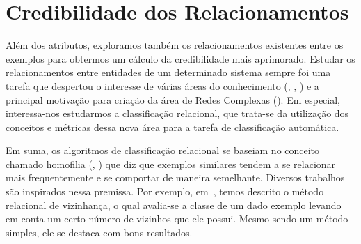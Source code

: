 

\section{Credibilidade dos Relacionamentos}
\label{sec::classificacaografos}

Além dos atributos, exploramos também os relacionamentos existentes entre os exemplos para obtermos um cálculo da credibilidade mais aprimorado.
Estudar os relacionamentos entre entidades de um determinado sistema sempre foi uma tarefa que despertou o interesse de várias áreas do conhecimento (\cite{Onody04}, \cite{Shen05}, \cite{Rubinov10}) e a principal motivação para criação da área de Redes Complexas (\cite{Newman03}). Em especial, interessa-nos estudarmos a classificação relacional, que trata-se da utilização dos conceitos e métricas dessa nova área para a tarefa de classificação automática.

Em suma, os algoritmos de classificação relacional se baseiam no conceito chamado homofilia (\cite{Blau77}, \cite{Mcpherson01})
que diz que 
exemplos similares tendem a se relacionar mais frequentemente e se comportar de maneira semelhante.
Diversos trabalhos são inspirados nessa premissa. Por exemplo, em~\cite{Macskassy04}, temos descrito o método relacional de vizinhança, o qual avalia-se 
a classe de um dado exemplo levando em conta um certo número de vizinhos que ele possui. Mesmo sendo um método simples, ele se destaca com bons resultados.


